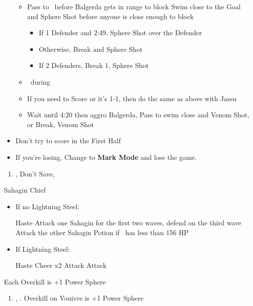 \begin{blitzball}
\begin{itemize}
\begin{itemize}
			      \item Pass to \tidus\ before Balgerda gets in range to block
			            \tidusf Swim close to the Goal and Sphere Shot before anyone is close enough to block
			            \begin{itemize}
				            \item If 1 Defender and 2:49, Sphere Shot over the Defender
				            \item Otherwise, Break and Sphere Shot
				            \item If 2 Defenders, Break 1, Sphere Shot
			            \end{itemize}
			      \item \sd\ during \wakka\ \cs
			      \item If you need to Score or it's 1-1, then do the same as above with Jassu
			      \item Wait until 4:20 then aggro Balgerda, Pass to \wakka
			            \wakkaf swim close and Venom Shot, or Break, Venom Shot
		      \end{itemize}
		\item Don't try to score in the First Half
		\item If you're losing, Change to \textbf{Mark Mode} and lose the game.
	\end{itemize}
\end{blitzball}
\begin{enumerate}[resume]
	\item \sd, Don't Save, \cs[1:00]
\end{enumerate}
\begin{battle}{Sahagin Chief}
	\begin{itemize}
		\item{If no Lightning Steel:}
		      \begin{itemize}
			      \tidusf Haste \tidus
			      \wakkaf Attack one Sahagin for the first two waves, defend on the third wave
			      \tidusf Attack the other Sahagin
			      \wakkaf Potion if \tidus\ has less than 156 HP
		      \end{itemize}
		\item{If Lightning Steel:}
		      \begin{itemize}
			      \tidusf Haste \tidus
			      \tidusf Cheer x2
			      \wakkaf Attack
			      \tidusf Attack
		      \end{itemize}
	\end{itemize}
	Each Overkill is +1 Power Sphere
\end{battle}
\begin{enumerate}[resume]
	\item \sd, \skippablefmv. Overkill on Vouivre is +1 Power Sphere
\end{enumerate}

